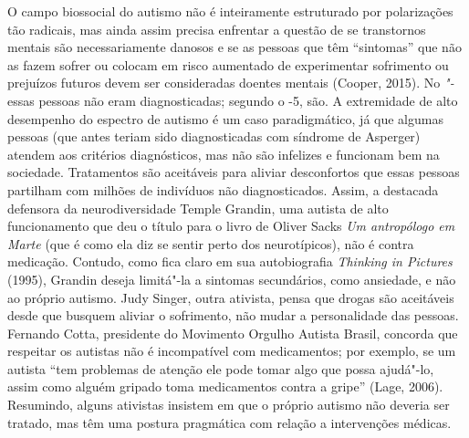 O campo biossocial do autismo não é inteiramente estruturado por
polarizações tão radicais, mas ainda assim precisa enfrentar a questão
de se transtornos mentais são necessariamente danosos e se as pessoas
que têm ``sintomas'' que não as fazem sofrer ou colocam em risco
aumentado de experimentar sofrimento ou prejuízos futuros devem ser
consideradas doentes mentais (Cooper, 2015). No \emph{"-} essas
pessoas não eram diagnosticadas; segundo o \emph{}-5, são. A
extremidade de alto desempenho do espectro de autismo é um caso
paradigmático, já que algumas pessoas (que antes teriam sido
diagnosticadas com síndrome de Asperger) atendem aos critérios
diagnósticos, mas não são infelizes e funcionam bem na sociedade.
Tratamentos são aceitáveis para aliviar desconfortos que essas pessoas
partilham com milhões de indivíduos não diagnosticados. Assim, a
destacada defensora da neurodiversidade Temple Grandin, uma autista de
alto funcionamento que deu o título para o livro de Oliver Sacks
\emph{Um antropólogo em Marte} (que é como ela diz se sentir perto dos
neurotípicos), não é contra medicação. Contudo, como fica claro em sua
autobiografia \emph{Thinking in Pictures} (1995), Grandin deseja
limitá"-la a sintomas secundários, como ansiedade, e não ao próprio
autismo. Judy Singer, outra ativista, pensa que drogas são aceitáveis
desde que busquem aliviar o sofrimento, não mudar a personalidade das
pessoas. Fernando Cotta, presidente do Movimento Orgulho Autista Brasil,
concorda que respeitar os autistas não é incompatível com medicamentos;
por exemplo, se um autista ``tem problemas de atenção ele pode tomar
algo que possa ajudá"-lo, assim como alguém gripado toma medicamentos
contra a gripe'' (Lage, 2006). Resumindo, alguns ativistas insistem em
que o próprio autismo não deveria ser tratado, mas têm uma postura
pragmática com relação a intervenções médicas.


